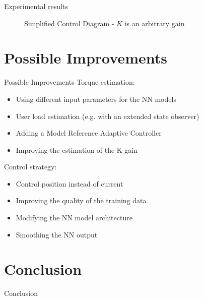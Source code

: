 \documentclass[aspectratio=169]{beamer}
\begin{document}
\begin{frame}{Experimental results}
\begin{figure}[htbp]
    \caption{
      Simplified Control Diagram - $K$ is an arbitrary gain 
    }
    \label{fig:simplified_control_diagram}
\end{figure}
\end{frame}

\section{Possible Improvements}
\begin{frame}{Possible Improvements}
Torque estimation:
\begin{itemize}
\item Using different input parameters for the NN models
\item User load estimation (e.g. with an extended state observer)
\item Adding a Model Reference Adaptive Controller
\item Improving the estimation of the K gain
\end{itemize}
Control strategy:
\begin{itemize}
\item Control position instead of current
\item Improving the quality of the training data
\item Modifying the NN model architecture 
\item Smoothing the NN output
\end{itemize}
\end{frame}

\section{Conclusion}
\begin{frame}{Conclusion}
\end{frame}
\end{document}
